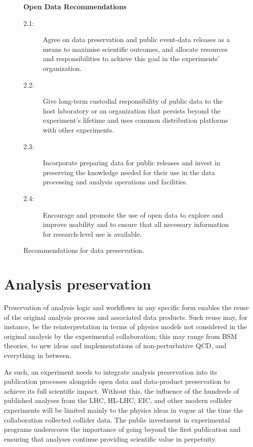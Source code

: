\documentclass[11pt]{article}
\begin{document}
\begin{figure}[!ht]
\begin{tcolorbox}
\begin{center}
{\large \textbf{Open Data Recommendations}}
\end{center}
%
\begin{description}
   \item[2.1:] Agree on \gls{data preservation} and public event-data releases as a means to maximise scientific outcomes, and allocate resources and responsibilities to achieve this goal in the experiments' organization.    \item[2.2:] Give long-term custodial responsibility of public \gls{data} to the host laboratory or an organization that persists beyond the experiment's lifetime and uses common distribution platforms with other experiments.
   \item[2.3:] Incorporate preparing \gls{data} for public releases and invest in preserving the knowledge needed for their use in the data processing and analysis operations and facilities.
   \item[2.4:] Encourage and promote the use of open data to explore and improve usability and to ensure that all necessary information for research-level use is available.
\end{description}
\end{tcolorbox}
\caption{Recommendations for data preservation.}
\label{fig:recs_opendata}
\end{figure}


\section{Analysis preservation}
\label{sec:analysis-preservation}


Preservation of analysis logic and workflows in any specific form enables the reuse of the original analysis process and associated \glspl{data product}. Such reuse may, for instance, be the \gls{reinterpretation} in terms of physics models not considered in the original analysis by the experimental collaboration; this may range from \gls{BSM} theories, to new ideas and implementations of non-perturbative \gls{QCD}, and everything in between.

As such, an experiment needs to integrate analysis preservation into its publication processes alongside open data and data-product preservation to achieve its full scientific impact. Without this, the influence of the hundreds of published analyses from the \gls{LHC}, \gls{HL-LHC}, \gls{EIC}, and other modern collider experiments will be limited mainly to the physics ideas in vogue at the time the collaboration collected collider data. The public investment in experimental programs underscores the importance of going beyond the first publication and ensuring that analyses continue providing scientific value in perpetuity.
\end{document}
